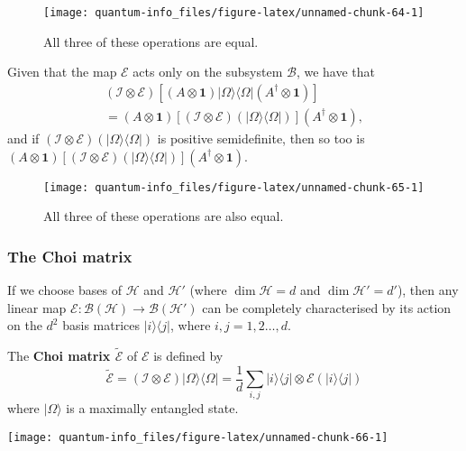 \documentclass[fleqn]{article}
\newenvironment{idea}{\noindent}{\medskip}
\begin{document}
\begin{figure}[H]

{\centering \texttt{[image: quantum-info\_files/figure-latex/unnamed-chunk-64-1]} 

}

\caption{All three of these operations are equal.}\label{fig:unnamed-chunk-64}
\end{figure}

Given that the map \(\mathcal{E}\) acts only on the subsystem \(\mathcal{B}\), we have that
\[
  \begin{gathered}
    (\mathcal{I}\otimes\mathcal{E})[(A\otimes\mathbf{1})|\Omega\rangle\langle\Omega|(A^\dagger\otimes\mathbf{1})]
  \\= (A\otimes\mathbf{1})[(\mathcal{I}\otimes\mathcal{E})(|\Omega\rangle\langle\Omega|)](A^\dagger\otimes\mathbf{1}),
  \end{gathered}
\]
and if \((\mathcal{I}\otimes\mathcal{E})(|\Omega\rangle\langle\Omega|)\) is positive semidefinite, then so too is \((A\otimes\mathbf{1})[(\mathcal{I}\otimes\mathcal{E})(|\Omega\rangle\langle\Omega|)](A^\dagger\otimes\mathbf{1})\).

\begin{figure}[H]

{\centering \texttt{[image: quantum-info\_files/figure-latex/unnamed-chunk-65-1]} 

}

\caption{All three of these operations are also equal.}\label{fig:unnamed-chunk-65}
\end{figure}

\hypertarget{the-choi-matrix}{%
\subsubsection{The Choi matrix}\label{the-choi-matrix}}

If we choose bases of \(\mathcal{H}\) and \(\mathcal{H}'\) (where \(\dim\mathcal{H}=d\) and \(\dim\mathcal{H}'=d'\)), then any linear map \(\mathcal{E}\colon\mathscr{B}(\mathcal{H})\to\mathscr{B}(\mathcal{H'})\) can be completely characterised by its action on the \(d^2\) basis matrices \(|i\rangle\langle j|\), where \(i,j=1,2\ldots,d\).

\begin{idea}

The \textbf{Choi matrix \(\widetilde{\mathcal{E}}\)} of \(\mathcal{E}\) is defined by
\[
  \widetilde{\mathcal{E}}
  = (\mathcal{I}\otimes\mathcal{E})|\Omega\rangle\langle\Omega|
  =\frac{1}{d}\sum_{i,j}|i\rangle\langle j|\otimes\mathcal{E}(|i\rangle\langle j|)
\]
where \(|\Omega\rangle\) is a maximally entangled state.

\begin{center}\texttt{[image: quantum-info\_files/figure-latex/unnamed-chunk-66-1]} \end{center}

\end{idea}
\end{document}
